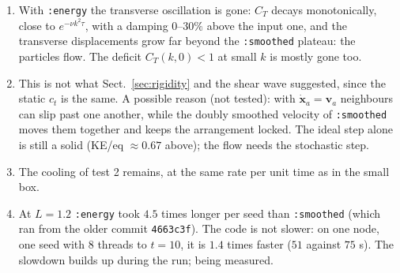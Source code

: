 \documentclass[11pt,aps,preprint,nofootinbib,superscriptaddress,tightenlines]{revtex4-2}
\def\Sect#1{Sect.~\ref{#1}}
\begin{document}
\begin{enumerate}
\item With \texttt{:energy} the transverse oscillation is gone: $C_T$ decays monotonically,
  close to $e^{-\nu k^2\tau}$, with a damping $0$--$30\%$ above the input one, and the
  transverse displacements grow far beyond the \texttt{:smoothed} plateau: the particles
  flow.  The deficit $C_T(k,0)<1$ at small $k$ is mostly gone too.
\item This is not what \Sect{sec:rigidity} and the shear wave suggested, since the static
  $c_t$ is the same.  A possible reason (not tested): with $\dot{\bm x}_a=\bm v_a$ neighbours
  can slip past one another, while the doubly smoothed velocity of \texttt{:smoothed} moves
  them together and keeps the arrangement locked.  The ideal step alone is still a solid
  (KE/eq $\approx0.67$ above); the flow needs the stochastic step.
\item The cooling of test 2 remains, at the same rate per unit time as in the small box.
\item At $L=1.2$ \texttt{:energy} took $4.5$ times longer per seed than \texttt{:smoothed}
  (which ran from the older commit \texttt{4663c3f}).  The code is not slower: on one node,
  one seed with 8 threads to $t=10$, it is $1.4$ times faster ($51$ against $75$ s).  The
  slowdown builds up during the run; being measured.
\end{enumerate}
\end{document}
